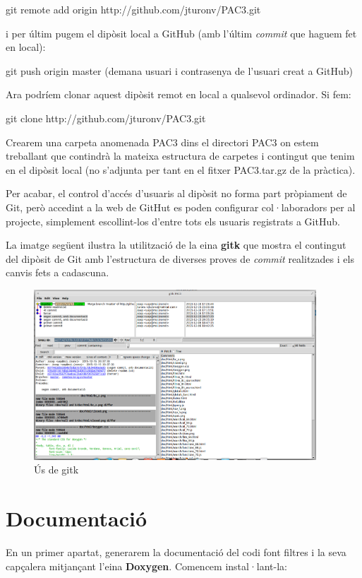 \documentclass{article}
\begin{document}
\qquad git remote add origin http://github.com/jturonv/PAC3.git\bigskip

i per últim pugem el dipòsit local a GitHub (amb l'últim \textit{commit} que haguem fet en local):\bigskip

\qquad git push origin master (demana usuari i contrasenya de l'usuari creat a GitHub)\bigskip

Ara podríem clonar aquest dipòsit remot en local a qualsevol ordinador. Si fem: \bigskip

\qquad git clone http://github.com/jturonv/PAC3.git \bigskip

Crearem una carpeta anomenada PAC3 dins el directori PAC3 on estem treballant que contindrà la mateixa estructura de carpetes i contingut que tenim en el dipòsit local (no s'adjunta per tant en el fitxer PAC3.tar.gz de la pràctica).\bigskip

Per acabar, el control d'accés d'usuaris al dipòsit no forma part pròpiament de Git, però accedint a la web de GitHut es poden configurar col·laboradors per al projecte, simplement escollint-los d'entre tots els usuaris registrats a GitHub.\bigskip

La imatge següent ilustra la utilització de la eina \textbf{gitk} que mostra el contingut del dipòsit de Git amb l'estructura de diverses proves de \textit{commit} realitzades i els canvis fets a cadascuna. \bigskip
\begin{figure}
\centering
\includegraphics[width=300pt]{gitk}
\caption{Ús de gitk}
\label{fig:gitk}
\end{figure}
\newpage

\section{Documentació}
En un primer apartat, generarem la documentació del codi font filtres i la seva capçalera mitjançant l'eina \textbf{Doxygen}. Comencem instal·lant-la: \bigskip
\end{document}
